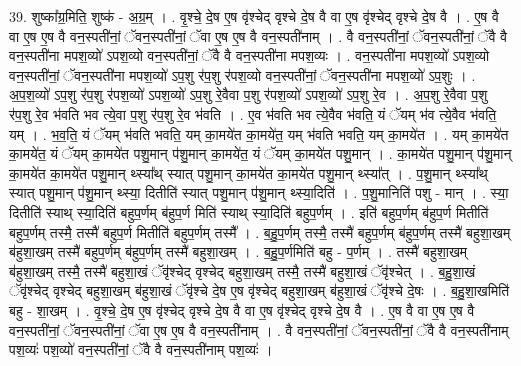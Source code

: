 \documentclass[17pt]{extarticle}
\begin{document}
39. शुष्का᳚ग्र॒मिति॒ शुष्क॑ - अ॒ग्र॒म् । . वृ॒श्चे॒ दे॒ष ए॒ष वृ॑श्चेद् वृश्चे दे॒ष वै वा ए॒ष वृ॑श्चेद् वृश्चे दे॒ष वै । . ए॒ष वै वा ए॒ष ए॒ष वै वन॒स्पती॑नां॒ ॅवन॒स्पती॑नां॒ ॅवा ए॒ष ए॒ष वै वन॒स्पती॑नाम् । . वै वन॒स्पती॑नां॒ ॅवन॒स्पती॑नां॒ ॅवै वै वन॒स्पती॑ना मपश॒व्यो॑ ऽपश॒व्यो वन॒स्पती॑नां॒ ॅवै वै वन॒स्पती॑ना मपश॒व्यः । . वन॒स्पती॑ना मपश॒व्यो॑ ऽपश॒व्यो वन॒स्पती॑नां॒ ॅवन॒स्पती॑ना मपश॒व्यो॑ ऽप॒शु र॑प॒शु र॑पश॒व्यो वन॒स्पती॑नां॒ ॅवन॒स्पती॑ना मपश॒व्यो॑ ऽप॒शुः । . अ॒प॒श॒व्यो॑ ऽप॒शु र॑प॒शु र॑पश॒व्यो॑ ऽपश॒व्यो॑ ऽप॒शु रे॒वैवा प॒शु र॑पश॒व्यो॑ ऽपश॒व्यो॑ ऽप॒शु रे॒व । . अ॒प॒शु रे॒वैवा प॒शु र॑प॒शु रे॒व भ॑वति भव त्ये॒वा प॒शु र॑प॒शु रे॒व भ॑वति । . ए॒व भ॑वति भव त्ये॒वैव भ॑वति॒ यं ॅयम् भ॑व त्ये॒वैव भ॑वति॒ यम् । . भ॒व॒ति॒ यं ॅयम् भ॑वति भवति॒ यम् का॒मये॑त का॒मये॑त॒ यम् भ॑वति भवति॒ यम् का॒मये॑त । . यम् का॒मये॑त का॒मये॑त॒ यं ॅयम् का॒मये॑त पशु॒मान् प॑शु॒मान् का॒मये॑त॒ यं ॅयम् का॒मये॑त पशु॒मान् । . का॒मये॑त पशु॒मान् प॑शु॒मान् का॒मये॑त का॒मये॑त पशु॒मान् थ्स्या᳚थ् स्यात् पशु॒मान् का॒मये॑त का॒मये॑त पशु॒मान् थ्स्या᳚त् । . प॒शु॒मान् थ्स्या᳚थ् स्यात् पशु॒मान् प॑शु॒मान् थ्स्या॒ दितीति॑ स्यात् पशु॒मान् प॑शु॒मान् थ्स्या॒दिति॑ । . प॒शु॒मानिति॑ पशु - मान् । . स्या॒ दितीति॑ स्याथ् स्या॒दिति॑ बहुप॒र्णम् ब॑हुप॒र्ण मिति॑ स्याथ् स्या॒दिति॑ बहुप॒र्णम् । . इति॑ बहुप॒र्णम् ब॑हुप॒र्ण मितीति॑ बहुप॒र्णम् तस्मै॒ तस्मै॑ बहुप॒र्ण मितीति॑ बहुप॒र्णम् तस्मै᳚ । . ब॒हु॒प॒र्णम् तस्मै॒ तस्मै॑ बहुप॒र्णम् ब॑हुप॒र्णम् तस्मै॑ बहुशा॒खम् ब॑हुशा॒खम् तस्मै॑ बहुप॒र्णम् ब॑हुप॒र्णम् तस्मै॑ बहुशा॒खम् । . ब॒हु॒प॒र्णमिति॑ बहु - प॒र्णम् । . तस्मै॑ बहुशा॒खम् ब॑हुशा॒खम् तस्मै॒ तस्मै॑ बहुशा॒खं ॅवृ॑श्चेद् वृश्चेद् बहुशा॒खम् तस्मै॒ तस्मै॑ बहुशा॒खं ॅवृ॑श्चेत् । . ब॒हु॒शा॒खं ॅवृ॑श्चेद् वृश्चेद् बहुशा॒खम् ब॑हुशा॒खं ॅवृ॑श्चे दे॒ष ए॒ष वृ॑श्चेद् बहुशा॒खम् ब॑हुशा॒खं ॅवृ॑श्चे दे॒षः । . ब॒हु॒शा॒खमिति॑ बहु - शा॒खम् । . वृ॒श्चे॒ दे॒ष ए॒ष वृ॑श्चेद् वृश्चे दे॒ष वै वा ए॒ष वृ॑श्चेद् वृश्चे दे॒ष वै । . ए॒ष वै वा ए॒ष ए॒ष वै वन॒स्पती॑नां॒ ॅवन॒स्पती॑नां॒ ॅवा ए॒ष ए॒ष वै वन॒स्पती॑नाम् । . वै वन॒स्पती॑नां॒ ॅवन॒स्पती॑नां॒ ॅवै वै वन॒स्पती॑नाम् पश॒व्यः॑ पश॒व्यो॑ वन॒स्पती॑नां॒ ॅवै वै वन॒स्पती॑नाम् पश॒व्यः॑ । \newline
\pagebreak
{}
\end{document}

